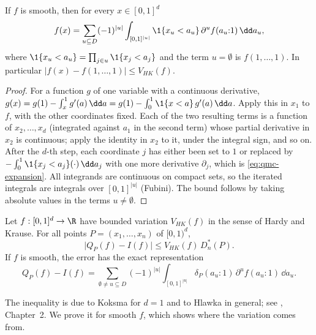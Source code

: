 \begin{lemma}\label{lem:qmc-expansion}
If $f$ is smooth, then for every $x\in[0,1]^d$
\begin{equation}\label{eq:qmc-expansion}
  f(x)=\sum_{u\subseteq D}(-1)^{|u|}\int_{[0,1]^{|u|}}\1\{x_u<a_u\}\,\partial^uf(a_u{:}1)\,\dd a_u,
\end{equation}
where $\1\{x_u<a_u\}=\prod_{j\in u}\1\{x_j<a_j\}$ and the term $u=\emptyset$ is
$f(1,\dots,1)$. In particular $|f(x)-f(1,\dots,1)|\le V_{HK}(f)$.
\end{lemma}

\begin{proof}
For a function $g$ of one variable with a continuous derivative,
$g(x)=g(1)-\int_x^1g'(a)\,\dd a=g(1)-\int_0^1\1\{x<a\}\,g'(a)\,\dd a$. Apply this in $x_1$
to $f$, with the other coordinates fixed. Each of the two resulting terms is a function of
$x_2,\dots,x_d$ (integrated against $a_1$ in the second term) whose partial derivative in $x_2$
is continuous; apply the identity in $x_2$ to it, under the integral sign, and so on. After
the $d$-th step, each coordinate $j$ has either been set to $1$ or replaced by
$-\int_0^1\1\{x_j<a_j\}(\cdot)\,\dd a_j$ with one more derivative $\partial_j$, which is
\eqref{eq:qmc-expansion}. All integrands are continuous on compact sets, so the iterated
integrals are integrals over $[0,1]^{|u|}$ (Fubini). The bound follows by taking absolute
values in the terms $u\ne\emptyset$.
\end{proof}

\begin{theorem}\label{thm:qmc-koksma-hlawka}
Let $f:[0,1]^d\to\R$ have bounded variation $V_{HK}(f)$ in the sense of Hardy and Krause.
For all points $P=(x_1,\dots,x_n)$ of $[0,1)^d$,
\begin{equation}\label{eq:qmc-kh}
  \big|Q_P(f)-I(f)\big|\le V_{HK}(f)\,D^*_n(P).
\end{equation}
If $f$ is smooth, the error has the exact representation
\begin{equation}\label{eq:qmc-zaremba}
  Q_P(f)-I(f)=\sum_{\emptyset\ne u\subseteq D}(-1)^{|u|}\int_{[0,1]^{|u|}}
  \delta_P(a_u{:}1)\,\partial^uf(a_u{:}1)\,\dd a_u .
\end{equation}
\end{theorem}

The inequality is due to Koksma for $d=1$ and to Hlawka in general; see
\textcite{niederreiter-qmc}, Chapter~2. We prove it for smooth $f$,
which shows where the variation comes from.

